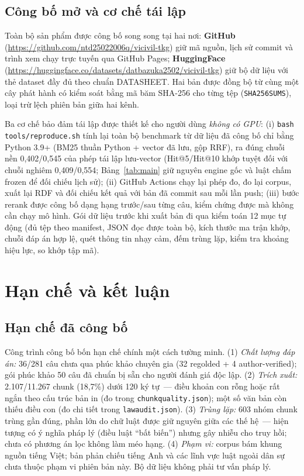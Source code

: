 \documentclass[12pt,a4paper]{report}
\renewcommand{\_}{\textunderscore\allowbreak}
\begin{document}
\section{Công bố mở và cơ chế tái lập}\label{sec:release}

Toàn bộ sản phẩm được công bố song song tại hai nơi: \textbf{GitHub} (\url{https://github.com/ntd25022006q/vicivil-tkg}) giữ mã nguồn, lịch sử commit và trình xem chạy trực tuyến qua GitHub Pages; \textbf{HuggingFace} (\url{https://huggingface.co/datasets/datbazuka2502/vicivil-tkg}) giữ bộ dữ liệu với thẻ dataset đầy đủ theo chuẩn DATASHEET. Hai bản được đồng bộ từ cùng một cây phát hành có kiểm soát bằng mã băm SHA-256 cho từng tệp (\texttt{SHA256SUMS}), loại trừ lệch phiên bản giữa hai kênh.

Ba cơ chế bảo đảm tái lập được thiết kế cho người dùng \emph{không có GPU}: (i) \texttt{bash tools/reproduce.sh} tính lại toàn bộ benchmark từ dữ liệu đã công bố chỉ bằng Python 3.9+ (BM25 thuần Python + vector đã lưu, gộp RRF), ra đúng chuỗi nền 0,402/0,545 của phép tái lập lưu-vector (Hit@5/Hit@10 khớp tuyệt đối với chuỗi nghiêm 0,409/0,554; Bảng~\ref{tab:main} giữ nguyên engine gốc và luật chấm frozen để đối chiếu lịch sử); (ii) GitHub Actions chạy lại phép đo, đo lại corpus, xuất lại RDF và đối chiếu kết quả với bản đã commit sau mỗi lần push; (iii) bước rerank được công bố dạng hạng trước/sau từng câu, kiểm chứng được mà không cần chạy mô hình. Gói dữ liệu trước khi xuất bản đi qua kiểm toán 12 mục tự động (đủ tệp theo manifest, JSON đọc được toàn bộ, kích thước ma trận khớp, chuỗi đáp án hợp lệ, quét thông tin nhạy cảm, đếm trùng lặp, kiểm tra khoảng hiệu lực, so khớp tập mã).

\chapter{Hạn chế và kết luận}\label{ch:ketluan}

\section{Hạn chế đã công bố}\label{sec:hanche}

Công trình công bố bốn hạn chế chính một cách tường minh. (1) \emph{Chất lượng đáp án:} 36/281 câu chưa qua phúc khảo chuyên gia (32 regolded + 4 author-verified); gói phúc khảo 50 câu đã chuẩn bị sẵn cho người đánh giá độc lập. (2) \emph{Trích xuất:} 2.107/11.267 chunk (18,7\%) dưới 120 ký tự~--- điều khoản con rỗng hoặc rất ngắn theo cấu trúc bản in (đo trong \texttt{chunk\_quality.json}); một số văn bản còn thiếu điều con (đo chi tiết trong \texttt{law\_audit.json}). (3) \emph{Trùng lặp:} 603 nhóm chunk trùng gần đúng, phần lớn do chữ luật được giữ nguyên giữa các thế hệ~--- hiện tượng có ý nghĩa pháp lý (điều luật ``bất biến'') nhưng gây nhiễu cho truy hồi; chưa có phương án lọc không làm méo hạng. (4) \emph{Phạm vi:} corpus bám khung nguồn tiếng Việt; bản phản chiếu tiếng Anh và các lĩnh vực luật ngoài dân sự chưa thuộc phạm vi phiên bản này. Bộ dữ liệu không phải tư vấn pháp lý.
\end{document}
